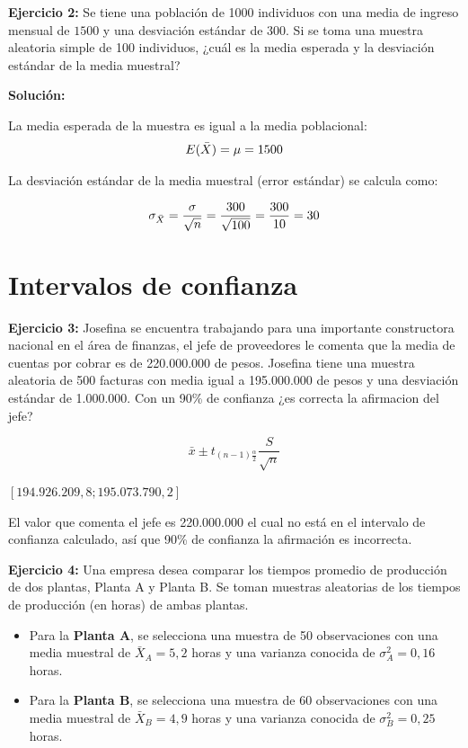 \documentclass[10pt,a4paper]{article}
\begin{document}
\textbf{Ejercicio 2:} Se tiene una población de 1000 individuos con una media de ingreso mensual de $1500$ y una desviación estándar de $300$. Si se toma una muestra aleatoria simple de 100 individuos, ¿cuál es la media esperada y la desviación estándar de la media muestral?

{\color{red} \textbf{Solución:}

La media esperada de la muestra es igual a la media poblacional:
$$E(\Bar{X}) = \mu = 1500$$


La desviación estándar de la media muestral (error estándar) se calcula como:

$$\sigma_{\Bar{X}} = \frac{\sigma}{\sqrt{n}} = \frac{300}{\sqrt{100}} = \frac{300}{10} = 30$$}



\section{Intervalos de confianza}



\textbf{Ejercicio 3:} Josefina se encuentra trabajando para una importante constructora nacional en el \'area de finanzas, el jefe de
proveedores le comenta que la media de cuentas por cobrar es de 220.000.000 de pesos. Josefina tiene una  muestra aleatoria de 500 facturas con media igual a 195.000.000 de pesos y una desviaci\'on
est\'andar de 1.000.000. Con un 90\% de confianza ¿es correcta la afirmacion del jefe?


{\color{red}
 $$  {\bar{x} \pm t_{(n-1)\frac{\alpha}{2}}\frac{S}{\sqrt{n}}}$$}

{\color{red}$[194.926.209,8 ; 195.073.790,2]$ }


   {\color{red}  El valor que comenta el jefe es 220.000.000 el cual no está en el intervalo de confianza calculado, así que  90\% de confianza la afirmación es incorrecta. }

   
\textbf{Ejercicio 4:} Una empresa desea comparar los tiempos promedio de producción de dos plantas, Planta A y Planta B. Se toman muestras aleatorias de los tiempos de producción (en horas) de ambas plantas.

\begin{itemize}
    \item Para la \textbf{Planta A}, se selecciona una muestra de 50 observaciones con una media muestral de \( \bar{X}_A = 5,2 \) horas y una varianza conocida de \( \sigma_A^2 = 0,16 \) horas.
    \item Para la \textbf{Planta B}, se selecciona una muestra de 60 observaciones con una media muestral de \( \bar{X}_B = 4,9 \) horas y una varianza conocida de \( \sigma_B^2 = 0,25 \) horas.
\end{itemize}
\end{document}
